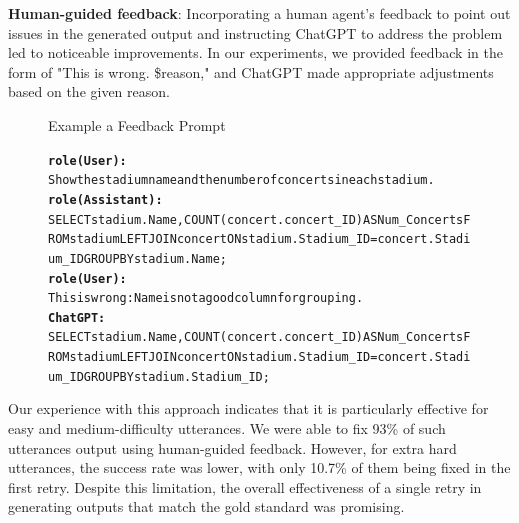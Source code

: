 \textbf{Human-guided feedback}: Incorporating a human agent's feedback to point out issues in the generated output and instructing ChatGPT to address the problem led to noticeable improvements. In our experiments, we provided feedback in the form of "This is wrong. \$reason," and ChatGPT made appropriate adjustments based on the given reason.

\begin{figure}[H]
    \begin{AIbox}{Example a Feedback Prompt}
        \vspace{-10px}
        \parbox{1\textwidth}{\scriptsize
        \begin{alltt} 
            {\bf role(User):} \\
            Show the stadium name and the number of concerts in each stadium.
            \\
            {\bf role(Assistant):} \\
            SELECT stadium.Name, COUNT(concert.concert\_ID) AS Num\_Concerts FROM stadium LEFT JOIN concert ON stadium.Stadium\_ID = concert.Stadium\_ID GROUP BY stadium.Name;
            \\
            {\bf role(User):} \\
            This is wrong: Name is not a good column for grouping.
            \\
            {\bf ChatGPT:} \\
            SELECT stadium.Name, COUNT(concert.concert\_ID) AS Num\_Concerts FROM stadium LEFT JOIN concert ON stadium.Stadium\_ID = concert.Stadium\_ID GROUP BY stadium.Stadium\_ID;
        \end{alltt}
        }
        \vspace{-10px}
    \end{AIbox}
\end{figure}

Our experience with this approach indicates that it is particularly effective for easy and medium-difficulty utterances. We were able to fix 93\% of such utterances output using human-guided feedback. However, for extra hard utterances, the success rate was lower, with only 10.7\% of them being fixed in the first retry. Despite this limitation, the overall effectiveness of a single retry in generating outputs that match the gold standard was promising. 


